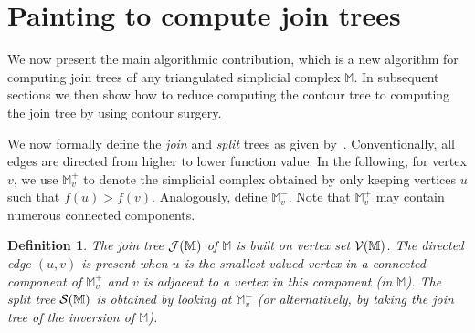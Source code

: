 \documentclass[11pt]{article}
\newtheorem{definition}[theorem]{Definition}
\theoremstyle{definition}
\newcommand{\cJ}{{\cal J}}
\newcommand{\cS}{{\cal S}}
\newcommand{\cV}{{\cal V}}
\newcommand{\MM}{\mathbb{M}}
\begin{document}





\section{Painting to compute join trees}
\label{sec:paint}

We now present the main algorithmic contribution, which is a new algorithm for computing join trees of any triangulated simplicial
complex $\MM$.  In subsequent sections we then show how to reduce computing the contour tree to computing the join tree by using contour surgery.

We now formally define the \emph{join} and \emph{split} trees as given by~\cite{csa-cctad-03}.
Conventionally, all edges are directed from higher to lower function value. 
In the following, for vertex $v$, we use $\MM^+_v$ to denote the simplicial complex obtained by only
keeping vertices $u$ such that $f(u) > f(v)$. Analogously, define $\MM^-_v$. Note that $\MM^+_v$ may contain
numerous connected components. 

\begin{definition} \label{def:join} The \emph{join tree} $\cJ(\MM)$ of $\MM$ is built on vertex set $\cV(\MM)$.
The directed edge $(u,v)$ is present when $u$ is the smallest valued vertex in a connected component of $\MM^+_v$
\emph{and} $v$ is adjacent to a vertex in this component (in $\MM$). The \emph{split tree} $\cS(\MM)$ is obtained
by looking at $\MM^-_v$ (or alternatively, by taking the join tree of the inversion of $\MM$). 
\end{definition}
\end{document}
